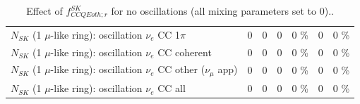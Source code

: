 \begin{table}
\begin{tabular}{| l | r | r | r  r | r  r |}
                     $N_{SK}$ (1 $\mu$-like ring): oscillation $\nu_e$ CC 1$\pi$ &               0 &               0 &               0 &        0 \%  &               0 &        0 \%  \\ 
                   $N_{SK}$ (1 $\mu$-like ring): oscillation $\nu_e$ CC coherent &               0 &               0 &               0 &        0 \%  &               0 &        0 \%  \\ 
      $N_{SK}$ (1 $\mu$-like ring): oscillation $\nu_e$ CC other ($\nu_\mu$ app) &               0 &               0 &               0 &        0 \%  &               0 &        0 \%  \\ 
                       $N_{SK}$ (1 $\mu$-like ring): oscillation $\nu_e$  CC all &               0 &               0 &               0 &        0 \%  &               0 &        0 \%  \\ 
\hline
\hline
\end{tabular}
\caption{ Effect of $f_{CCQEoth; r}^{SK}$ for no oscillations (all mixing parameters set to 0).. }
\label{tab:num_sk_1Rmu_ccqe_other_eff_1RmuT_3f_osc_t13:0}
\end{table}
\clearpage
